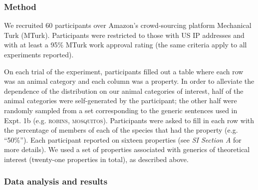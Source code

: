 \documentclass[11pt,letterpaper]{article}
\begin{document}
\subsubsection*{Method}

We recruited 60 participants over Amazon's crowd-sourcing platform Mechanical Turk (MTurk).  
Participants were restricted to those with US IP addresses and with at least a 95\% MTurk work approval rating (the same criteria apply to all experiments reported). 

On each trial of the experiment, participants filled out a table where each row was an animal category and each column was a property. 
In order to alleviate the dependence of the distribution on our animal categories of interest, half of the animal categories were self-generated by the participant; the other half were randomly sampled from a set corresponding to the generic sentences used in Expt. 1b (e.g. \textsc{robins, mosquitos}).
Participants were asked to fill in each row with the percentage of members of each of the species that had the property (e.g. ``50\%'').
Each participant reported on sixteen properties (see {\it SI Section A} for more details).
We used a set of properties associated with generics of theoretical interest (twenty-one properties in total), as described above.
 
\subsubsection*{Data analysis and results}
 
\end{document}
